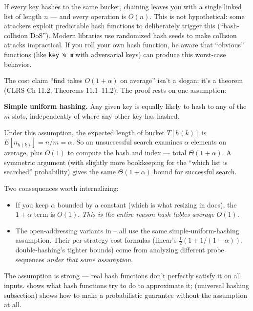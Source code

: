 \documentclass[11pt]{article}
\begin{document}
\begin{warnbox}
If every key hashes to the same bucket, chaining leaves you with
a single linked list of length $n$ --- and every operation is
$O(n)$. This is not hypothetical: some attackers exploit
predictable hash functions to deliberately trigger this
(``hash-collision DoS''). Modern libraries use randomized hash
seeds to make collision attacks impractical. If you roll your
own hash function, be aware that ``obvious'' functions (like
\texttt{key \% m} with adversarial keys) can produce this
worst-case behavior.
\end{warnbox}

\begin{notebox}
The cost claim ``find takes $O(1+\alpha)$ on average'' isn't a
slogan; it's a theorem (CLRS Ch 11.2, Theorems 11.1--11.2). The
proof rests on one assumption:

\textbf{Simple uniform hashing.} Any given key is equally likely
to hash to any of the $m$ slots, independently of where any other
key has hashed.

Under this assumption, the expected length of bucket $T[h(k)]$ is
$E[n_{h(k)}] = n/m = \alpha$. So an unsuccessful search examines
$\alpha$ elements on average, plus $O(1)$ to compute the hash and
index --- total $\Theta(1 + \alpha)$. A symmetric argument (with
slightly more bookkeeping for the ``which list is searched''
probability) gives the same $\Theta(1 + \alpha)$ bound for
successful search.

Two consequences worth internalizing:
\begin{itemize}[leftmargin=*]
  \item If you keep $\alpha$ bounded by a constant (which is what
        resizing in  does), the $1 + \alpha$ term
        is $O(1)$. \emph{This is the entire reason hash tables
        average $O(1)$.}
  \item The open-addressing variants in --
        all use the same simple-uniform-hashing assumption. Their
        per-strategy cost formulas (linear's
        $\frac{1}{2}(1 + 1/(1-\alpha))$, double-hashing's tighter
        bounds) come from analyzing different probe sequences
        \emph{under that same assumption}.
\end{itemize}
The assumption is strong --- real hash functions don't perfectly
satisfy it on all inputs.  shows what hash
functions try to do to approximate it;  (universal
hashing subsection) shows how to make a probabilistic guarantee
without the assumption at all.
\end{notebox}
\end{document}
